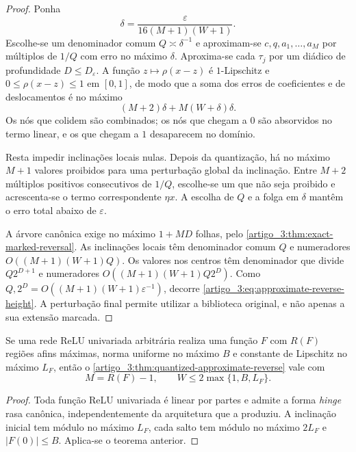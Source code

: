 \begin{proof}
Ponha
\[
 \delta=\frac{\varepsilon}{16(M+1)(W+1)}.
\]
Escolhe-se um denominador comum $Q\asymp\delta^{-1}$ e aproximam-se
$c,q,a_1,\ldots,a_M$ por múltiplos de $1/Q$ com erro no máximo $\delta$.
Aproxima-se cada $\tau_j$ por um diádico de profundidade
$D\le D_\varepsilon$. A função $z\mapsto\rho(x-z)$ é $1$-Lipschitz e
$0\le\rho(x-z)\le1$ em $[0,1]$, de modo que a soma dos erros de coeficientes
e de deslocamentos é no máximo
\[
 (M+2)\delta+M(W+\delta)\delta.
\]
Os nós que colidem são combinados; os nós que chegam a $0$ são absorvidos no termo
linear, e os que chegam a $1$ desaparecem no domínio.

Resta impedir inclinações locais nulas. Depois da quantização, há no máximo
$M+1$ valores proibidos para uma perturbação global da inclinação. Entre
$M+2$ múltiplos positivos consecutivos de $1/Q$, escolhe-se um que não seja
proibido e acrescenta-se o termo correspondente $\eta x$. A escolha de $Q$ e a
folga em $\delta$ mantêm o erro total abaixo de $\varepsilon$.

A árvore canônica exige no máximo $1+MD$ folhas, pelo
\cref{artigo_3:thm:exact-marked-reversal}. As inclinações locais têm denominador comum
$Q$ e numeradores $O((M+1)(W+1)Q)$. Os valores nos centros têm denominador que
divide $Q2^{D+1}$ e numeradores
$O((M+1)(W+1)Q2^D)$. Como
$Q,2^D=O((M+1)(W+1)\varepsilon^{-1})$, decorre
\eqref{artigo_3:eq:approximate-reverse-height}. A perturbação final permite utilizar a
biblioteca original, e não apenas a sua extensão marcada.
\end{proof}

\begin{corollary}\label{map:artigo_3:5.6}
\label{artigo_3:cor:deep-functional-reverse}
Se uma rede ReLU univariada arbitrária realiza uma função $F$ com $R(F)$
regiões afins máximas, norma uniforme no máximo $B$ e constante de Lipschitz
no máximo $L_F$, então o \cref{artigo_3:thm:quantized-approximate-reverse} vale com
\begin{equation}
 M=R(F)-1,
 \qquad
 W\le2\max\{1,B,L_F\}.
 \label{artigo_3:eq:deep-realized-resources}
\end{equation}
\end{corollary}

\begin{proof}
Toda função ReLU univariada é linear por partes e admite a forma \emph{hinge} rasa
canônica, independentemente da arquitetura que a produziu. A inclinação
inicial tem módulo no máximo $L_F$, cada salto tem módulo no máximo $2L_F$ e
$|F(0)|\le B$. Aplica-se o teorema anterior.
\end{proof}

